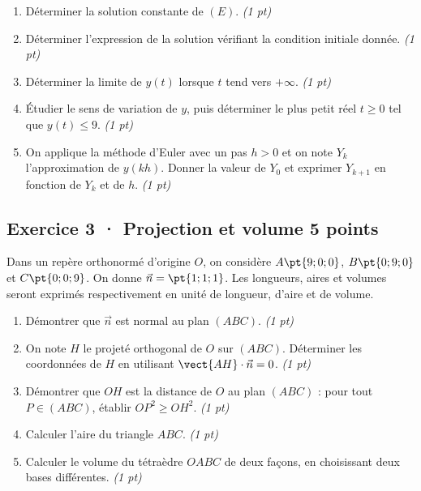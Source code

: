 \begin{enumerate}

\item Déterminer la solution constante de $(E)$. \hfill\textit{(1 pt)}

\item Déterminer l'expression de la solution vérifiant la condition initiale donnée. \hfill\textit{(1 pt)}

\item Déterminer la limite de $y(t)$ lorsque $t$ tend vers $+\infty$. \hfill\textit{(1 pt)}

\item Étudier le sens de variation de $y$, puis déterminer le plus petit réel $t\ge0$ tel que $y(t)\le9$. \hfill\textit{(1 pt)}

\item On applique la méthode d'Euler avec un pas $h>0$ et on note $Y_k$ l'approximation de $y(kh)$. Donner la valeur de $Y_0$ et exprimer $Y_{k+1}$ en fonction de $Y_k$ et de $h$. \hfill\textit{(1 pt)}

\end{enumerate}

\mxnewpage{}

\subsection*{Exercice 3 · Projection et volume \hfill 5 points}Dans un repère orthonormé d'origine $O$, on considère $A\pt{9;0;0}$, $B\pt{0;9;0}$ et $C\pt{0;0;9}$. On donne $\vec n=\pt{1;1;1}$. Les longueurs, aires et volumes seront exprimés respectivement en unité de longueur, d'aire et de volume.

\begin{enumerate}

\item Démontrer que $\vec n$ est normal au plan $(ABC)$. \hfill\textit{(1 pt)}

\item On note $H$ le projeté orthogonal de $O$ sur $(ABC)$. Déterminer les coordonnées de $H$ en utilisant $\vect{AH}\cdot\vec n=0$. \hfill\textit{(1 pt)}

\item Démontrer que $OH$ est la distance de $O$ au plan $(ABC)$ : pour tout $P\in(ABC)$, établir $OP^2\ge OH^2$. \hfill\textit{(1 pt)}

\item Calculer l'aire du triangle $ABC$. \hfill\textit{(1 pt)}

\item Calculer le volume du tétraèdre $OABC$ de deux façons, en choisissant deux bases différentes. \hfill\textit{(1 pt)}

\end{enumerate}

